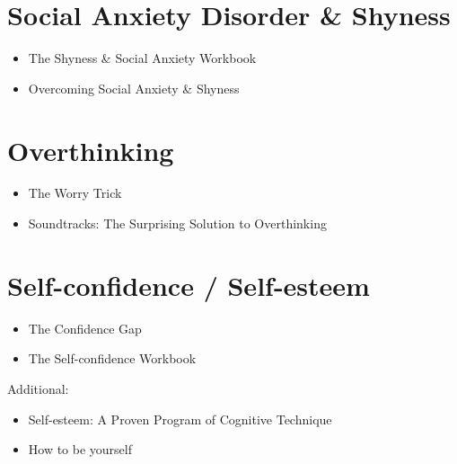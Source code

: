 \documentclass[12pt, a4paper]{article}
\newenvironment{additional}{%
    \begin{list}{}%
        {\setlength{\leftmargin}{\parindent}}%
        \item[]%
        Additional:
        \begin{itemize}}
    {\end{itemize}\end{list}}
\begin{document}
\section{Social Anxiety Disorder \& Shyness}
\begin{itemize}
    \item The Shyness \& Social Anxiety Workbook
    \item Overcoming Social Anxiety \& Shyness
\end{itemize}

\section{Overthinking}
\begin{itemize}
    \item The Worry Trick
    \item Soundtracks: The Surprising Solution to Overthinking
\end{itemize}

\section{Self-confidence / Self-esteem}
\begin{itemize}
    \item The Confidence Gap
    \item The Self-confidence Workbook
\end{itemize}
\begin{additional}
    \item Self-esteem: A Proven Program of Cognitive Technique
    \item How to be yourself
\end{additional}
\end{document}
